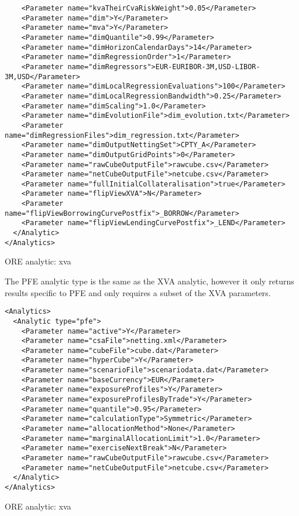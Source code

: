 {\begin{listing}[H]
\begin{verbatim}
    <Parameter name="kvaTheirCvaRiskWeight">0.05</Parameter>
    <Parameter name="dim">Y</Parameter>
    <Parameter name="mva">Y</Parameter>
    <Parameter name="dimQuantile">0.99</Parameter>
    <Parameter name="dimHorizonCalendarDays">14</Parameter>
    <Parameter name="dimRegressionOrder">1</Parameter>
    <Parameter name="dimRegressors">EUR-EURIBOR-3M,USD-LIBOR-3M,USD</Parameter>
    <Parameter name="dimLocalRegressionEvaluations">100</Parameter>
    <Parameter name="dimLocalRegressionBandwidth">0.25</Parameter>
    <Parameter name="dimScaling">1.0</Parameter>
    <Parameter name="dimEvolutionFile">dim_evolution.txt</Parameter>
    <Parameter name="dimRegressionFiles">dim_regression.txt</Parameter>
    <Parameter name="dimOutputNettingSet">CPTY_A</Parameter>      
    <Parameter name="dimOutputGridPoints">0</Parameter>
    <Parameter name="rawCubeOutputFile">rawcube.csv</Parameter>
    <Parameter name="netCubeOutputFile">netcube.csv</Parameter>
    <Parameter name="fullInitialCollateralisation">true</Parameter>
    <Parameter name="flipViewXVA">N</Parameter>
    <Parameter name="flipViewBorrowingCurvePostfix">_BORROW</Parameter>
    <Parameter name="flipViewLendingCurvePostfix">_LEND</Parameter>
  </Analytic>
</Analytics>
\end{verbatim}
\caption{ORE analytic: xva}
\label{lst:ore_xva}
\end{listing}

The PFE analytic type is the same as the XVA analytic, however it only returns results specific to PFE and only requires a subset of the XVA parameters.

\begin{listing}[H]
\begin{verbatim}
<Analytics>
  <Analytic type="pfe">
    <Parameter name="active">Y</Parameter>
    <Parameter name="csaFile">netting.xml</Parameter>
    <Parameter name="cubeFile">cube.dat</Parameter>
    <Parameter name="hyperCube">Y</Parameter>
    <Parameter name="scenarioFile">scenariodata.dat</Parameter>
    <Parameter name="baseCurrency">EUR</Parameter>
    <Parameter name="exposureProfiles">Y</Parameter>
    <Parameter name="exposureProfilesByTrade">Y</Parameter>
    <Parameter name="quantile">0.95</Parameter>
    <Parameter name="calculationType">Symmetric</Parameter>
    <Parameter name="allocationMethod">None</Parameter>
    <Parameter name="marginalAllocationLimit">1.0</Parameter>
    <Parameter name="exerciseNextBreak">N</Parameter>
    <Parameter name="rawCubeOutputFile">rawcube.csv</Parameter>
    <Parameter name="netCubeOutputFile">netcube.csv</Parameter>
  </Analytic>
</Analytics>
\end{verbatim}
\caption{ORE analytic: xva}
\label{lst:ore_xva}
\end{listing}

}
